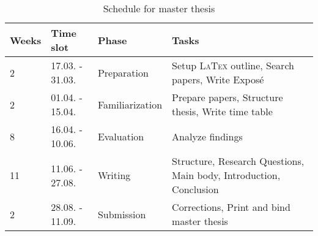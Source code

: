 \documentclass[
    numbers=noenddot,
    parskip=half-,
    fontsize=12pt,
    paper=a4,
    oneside,
    titlepage,
    bibliography=totoc,
    chapterprefix=false,
]{scrbook}
\newcommand{\latex}{\textsc{LaTex}}
\begin{document}
 	\begin{table}[ht]
 		\label{tab:schedule}
 		\caption{Schedule for master thesis}
 		\begin{tabular}{p{1cm}p{3cm}p{3cm}p{8cm}}
 			Weeks & Time slot & Phase & Tasks \\
 			\hline
 			2 & 17.03. - 31.03. & Preparation & Setup \latex{} outline, Search papers, Write Exposé \\
 			2 & 01.04. - 15.04. & Familiarization & Prepare papers, Structure thesis, Write time table \\
 			8 & 16.04. - 10.06. & Evaluation & Analyze findings \\
 			11 & 11.06. - 27.08. & Writing & Structure, Research Questions, Main body, Introduction, Conclusion \\
 			2 & 28.08. - 11.09. & Submission & Corrections, Print and bind master thesis \\
 			\hline
 		\end{tabular}
 	\end{table}


    \backmatter

    \printbibliography
    
\end{document}
